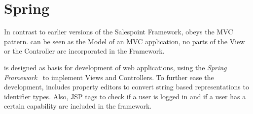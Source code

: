\section{Spring}
\label{spring}
In contrast to earlier versions of the Salespoint Framework, \salespoint{} obeys the MVC pattern. 
\salespoint{} can be seen as the Model of an MVC application, no parts of the View or the Controller are incorporated in the Framework.

\salespoint{} is designed as basis for development of web applications, using the \textit{Spring Framework}~\cite{spring} to implement Views and Controllers.
To further ease the development, \salespoint{} includes property editors to convert string based representations to \salespoint{} identifier types.
Also, JSP tags to check if a user is logged in and if a user has a certain capability are included in the framework.
